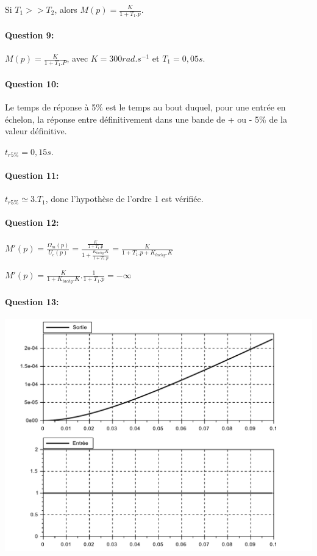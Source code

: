 Si $T_1>>T_2$, alors $M(p)=\frac{K}{1+T_1.p}$.

\paragraph{Question 9:}

$M(p)=\frac{K}{1+T_1.P}$, avec $K=300rad.s^{-1}$ et $T_1=0,05s$.

\paragraph{Question 10:}

Le temps de réponse à 5\% est le temps au bout duquel, pour une entrée en échelon, la réponse entre définitivement dans une bande de + ou - 5\% de la valeur définitive.

$t_{r5\%}=0,15s$.

\paragraph{Question 11:}

$t_{r5\%}\simeq3.T_1$, donc l'hypothèse de l'ordre 1 est vérifiée.

\paragraph{Question 12:}

$M'(p)=\frac{\Omega_m(p)}{U_c(p)}=\frac{\frac{K}{1+T_1.p}}{1+\frac{K_{tachy}.K}{1+T_1.p}}=\frac{K}{1+T_1.p+K_{tachy}.K}$

$M'(p)=\frac{K}{1+K_{tachy}.K}.\frac{1}{1+T_1.p}=-\infty$

\paragraph{Question 13:}

\begin{center}
	\includegraphics[width=\linewidth]{img/cor13}
\end{center}

